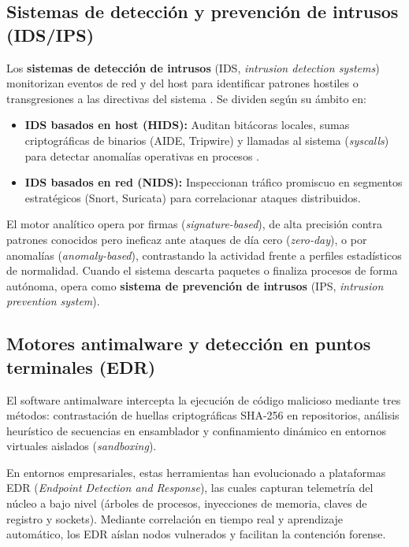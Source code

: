 \documentclass[12pt]{article}
\begin{document}
\subsection{Sistemas de detección y prevención de intrusos (IDS/IPS)}\label{subsec:sistemasIdsIps}

Los \textbf{sistemas de detección de intrusos} (IDS, \textit{intrusion detection systems}) monitorizan eventos de red y del host para identificar patrones hostiles o transgresiones a las directivas del sistema \parencite[\S 15.1, p.\ 660]{stallings2018operating}. Se dividen según su ámbito en:
\begin{itemize}[noitemsep, topsep=2pt]
    \item \textbf{IDS basados en host (HIDS):} Auditan bitácoras locales, sumas criptográficas de binarios (AIDE, Tripwire) y llamadas al sistema (\textit{syscalls}) para detectar anomalías operativas en procesos \parencite[\S 15.1, p.\ 661]{stallings2018operating}.
    \item \textbf{IDS basados en red (NIDS):} Inspeccionan tráfico promiscuo en segmentos estratégicos (Snort, Suricata) para correlacionar ataques distribuidos.
\end{itemize}

El motor analítico opera por firmas (\textit{signature-based}), de alta precisión contra patrones conocidos pero ineficaz ante ataques de día cero (\textit{zero-day}), o por anomalías (\textit{anomaly-based}), contrastando la actividad frente a perfiles estadísticos de normalidad. Cuando el sistema descarta paquetes o finaliza procesos de forma autónoma, opera como \textbf{sistema de prevención de intrusos} (IPS, \textit{intrusion prevention system}).

\subsection{Motores antimalware y detección en puntos terminales (EDR)}\label{subsec:motoresAntimalwareEdr}

El software antimalware intercepta la ejecución de código malicioso \parencite[\S 19.6.3, p.\ 941]{deitel2004operating} mediante tres métodos: contrastación de huellas criptográficas SHA-256 en repositorios, análisis heurístico de secuencias en ensamblador y confinamiento dinámico en entornos virtuales aislados (\textit{sandboxing}).

En entornos empresariales, estas herramientas han evolucionado a plataformas EDR (\textit{Endpoint Detection and Response}), las cuales capturan telemetría del núcleo a bajo nivel (árboles de procesos, inyecciones de memoria, claves de registro y sockets). Mediante correlación en tiempo real y aprendizaje automático, los EDR aíslan nodos vulnerados y facilitan la contención forense.
\end{document}

